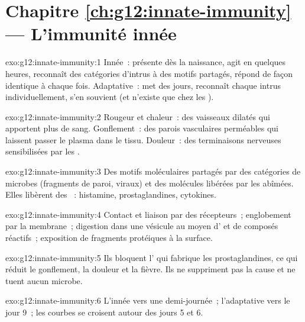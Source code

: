 \section*{Chapitre \ref{ch:g12:innate-immunity} --- L'immunité innée}

\begin{solution}{exo:g12:innate-immunity:1}
Innée~: présente dès la naissance, agit en quelques heures, reconnaît
des catégories d'intrus à des motifs partagés, répond de façon
identique à chaque fois. Adaptative~: met des jours, reconnaît chaque
intrus individuellement, s'en souvient (et n'existe que chez les
).
\end{solution}

\begin{solution}{exo:g12:innate-immunity:2}
Rougeur et chaleur~: des vaisseaux dilatés qui apportent plus de sang.
Gonflement~: des parois vasculaires perméables qui laissent passer le
plasma dans le tissu. Douleur~: des terminaisons nerveuses
sensibilisées par les .
\end{solution}

\begin{solution}{exo:g12:innate-immunity:3}
Des motifs moléculaires partagés par des catégories de microbes
(fragments de paroi,  viraux) et des molécules
libérées par les  abîmées. Elles libèrent des ~:
histamine, prostaglandines, cytokines.
\end{solution}

\begin{solution}{exo:g12:innate-immunity:4}
Contact et liaison par des récepteurs~; englobement par la membrane~;
digestion dans une vésicule au moyen d' et de composés
réactifs~; exposition de fragments protéiques à la surface.
\end{solution}

\begin{solution}{exo:g12:innate-immunity:5}
Ils bloquent l' qui fabrique les prostaglandines, ce qui réduit
le gonflement, la douleur et la fièvre. Ils ne suppriment pas la cause
et ne tuent aucun microbe.
\end{solution}

\begin{solution}{exo:g12:innate-immunity:6}
L'innée vers une demi-journée~; l'adaptative vers le jour 9~; les
courbes se croisent autour des jours 5 et 6.
\end{solution}

